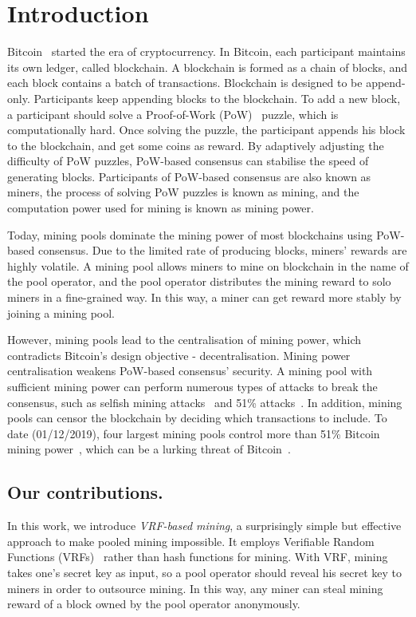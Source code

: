 \section{Introduction}
\label{sec:intro}

Bitcoin~\cite{nakamoto2008bitcoin} started the era of cryptocurrency.
In Bitcoin, each participant maintains its own ledger, called blockchain.
A blockchain is formed as a chain of blocks, and each block contains a batch of transactions.
Blockchain is designed to be append-only.
Participants keep appending blocks to the blockchain.
To add a new block, a participant should solve a Proof-of-Work (PoW)~\cite{dwork1992pricing} puzzle, which is computationally hard.
Once solving the puzzle, the participant appends his block to the blockchain, and get some coins as reward.
By adaptively adjusting the difficulty of PoW puzzles, PoW-based consensus can stabilise the speed of generating blocks.
Participants of PoW-based consensus are also known as miners, the process of solving PoW puzzles is known as mining, and the computation power used for mining is known as mining power.

Today, mining pools dominate the mining power of most blockchains using PoW-based consensus.
Due to the limited rate of producing blocks, miners' rewards are highly volatile.
A mining pool allows miners to mine on blockchain in the name of the pool operator, and the pool operator distributes the mining reward to solo miners in a fine-grained way.
In this way, a miner can get reward more stably by joining a mining pool.

However, mining pools lead to the centralisation of mining power, which contradicts Bitcoin's design objective - decentralisation.
Mining power centralisation weakens PoW-based consensus' security.
A mining pool with sufficient mining power can perform numerous types of attacks to break the consensus, such as selfish mining attacks~\cite{eyal2018majority} and 51\% attacks~\cite{nakamoto2008bitcoin}.
In addition, mining pools can censor the blockchain by deciding which transactions to include.
To date (01/12/2019), four largest mining pools control more than 51\% Bitcoin mining power~\cite{btc-com}, which can be a lurking threat of Bitcoin~\cite{yu2019repucoin, hansucker}.




\subsection{Our contributions.}
In this work, we introduce \textit{VRF-based mining}, a surprisingly simple but effective approach to make pooled mining impossible.
It employs Verifiable Random Functions (VRFs)~\cite{micali1999verifiable} rather than hash functions for mining.
With VRF, mining takes one's secret key as input, so a pool operator should reveal his secret key to miners in order to outsource mining.
In this way, any miner can steal mining reward of a block owned by the pool operator anonymously.

